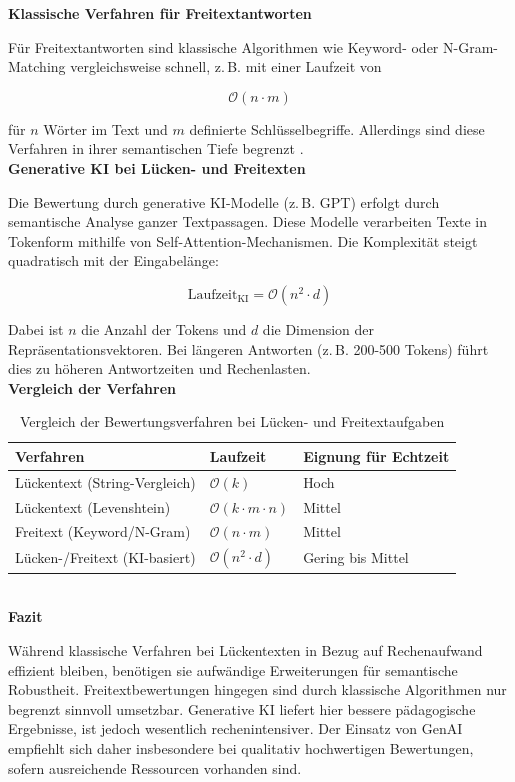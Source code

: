 \documentclass[a4paper,12pt]{article}
\begin{document}
\textbf{Klassische Verfahren für Freitextantworten} 

Für Freitextantworten sind klassische Algorithmen wie Keyword- oder N-Gram-Matching vergleichsweise schnell, z.\,B. mit einer Laufzeit von

\[
\mathcal{O}(n \cdot m)
\]

für \(n\) Wörter im Text und \(m\) definierte Schlüsselbegriffe. Allerdings sind diese Verfahren in ihrer semantischen Tiefe begrenzt \parencite{navarro, jurafsky}.\\

\textbf{Generative KI bei Lücken- und Freitexten}  

Die Bewertung durch generative KI-Modelle (z.\,B. GPT) erfolgt durch semantische Analyse ganzer Textpassagen. Diese Modelle verarbeiten Texte in Tokenform mithilfe von Self-Attention-Mechanismen. Die Komplexität steigt quadratisch mit der Eingabelänge:

\[
\text{Laufzeit}_{\text{KI}} = \mathcal{O}(n^2 \cdot d)
\]

Dabei ist \(n\) die Anzahl der Tokens und \(d\) die Dimension der Repräsentationsvektoren. Bei längeren Antworten (z.\,B. 200-500 Tokens) führt dies zu höheren Antwortzeiten und Rechenlasten.\\

\newpage
\textbf{Vergleich der Verfahren}  
\begin{table}[h!]
\centering
\begin{tabular}{@{}lll@{}}
\toprule
\textbf{Verfahren} & \textbf{Laufzeit} & \textbf{Eignung für Echtzeit} \\
\midrule
Lückentext (String-Vergleich) & \( \mathcal{O}(k) \) & Hoch \\
Lückentext (Levenshtein) & \( \mathcal{O}(k \cdot m \cdot n) \) & Mittel \\
Freitext (Keyword/N-Gram) & \( \mathcal{O}(n \cdot m) \) & Mittel \\
Lücken-/Freitext (KI-basiert) & \( \mathcal{O}(n^2 \cdot d) \) & Gering bis Mittel \\
\bottomrule
\end{tabular}
\caption{Vergleich der Bewertungsverfahren bei Lücken- und Freitextaufgaben}
\end{table}\\

\textbf{Fazit}

Während klassische Verfahren bei Lückentexten in Bezug auf Rechenaufwand effizient bleiben, benötigen sie aufwändige Erweiterungen für semantische Robustheit. Freitextbewertungen hingegen sind durch klassische Algorithmen nur begrenzt sinnvoll umsetzbar. Generative KI liefert hier bessere pädagogische Ergebnisse, ist jedoch wesentlich rechenintensiver. Der Einsatz von GenAI empfiehlt sich daher insbesondere bei qualitativ hochwertigen Bewertungen, sofern ausreichende Ressourcen vorhanden sind.
\end{document}
